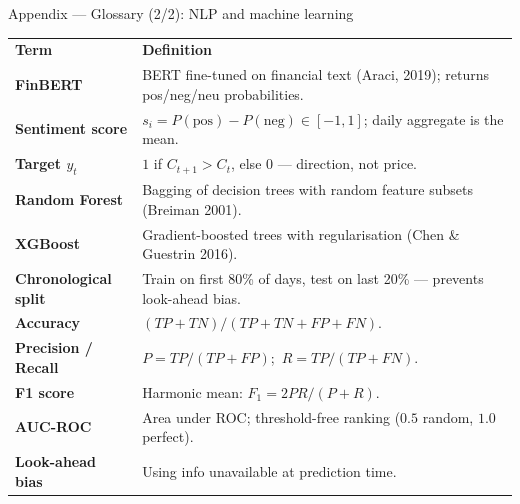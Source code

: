 \documentclass[aspectratio=169,11pt]{beamer}
\newcommand{\heading}[1]{{\color{TecBlue}\textbf{#1}}}
\begin{document}
\begin{frame}{Appendix --- Glossary (2/2): NLP and machine learning}
\scriptsize
\renewcommand{\arraystretch}{1.05}
\begin{tabular}{@{}p{2.8cm} p{\dimexpr\linewidth-2.8cm-2\tabcolsep\relax}@{}}
\rowcolor{TecBlue}
{\color{white}\textbf{Term}} & {\color{white}\textbf{Definition}} \\
\heading{FinBERT}             & BERT fine-tuned on financial text (Araci, 2019); returns pos/neg/neu probabilities. \\
\heading{Sentiment score}     & $s_i = P(\text{pos}) - P(\text{neg}) \in [-1,1]$; daily aggregate is the mean. \\
\heading{Target $y_t$}        & $1$ if $C_{t+1} > C_t$, else $0$ --- direction, not price. \\
\heading{Random Forest}       & Bagging of decision trees with random feature subsets (Breiman 2001). \\
\heading{XGBoost}             & Gradient-boosted trees with regularisation (Chen \& Guestrin 2016). \\
\heading{Chronological split} & Train on first 80\% of days, test on last 20\% --- prevents look-ahead bias. \\
\heading{Accuracy}            & $(TP+TN)/(TP+TN+FP+FN)$. \\
\heading{Precision / Recall}  & $P = TP/(TP+FP)$;\ $R = TP/(TP+FN)$. \\
\heading{F1 score}            & Harmonic mean: $F_1 = 2PR/(P+R)$. \\
\heading{AUC-ROC}             & Area under ROC; threshold-free ranking ($0.5$ random, $1.0$ perfect). \\
\heading{Look-ahead bias}     & Using info unavailable at prediction time. \\
\end{tabular}
\end{frame}
\end{document}
